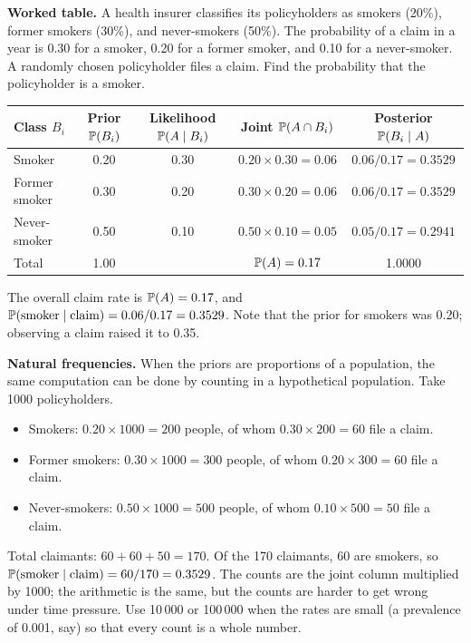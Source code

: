\textbf{Worked table.} A health insurer classifies its policyholders as smokers (20\%),
former smokers (30\%), and never-smokers (50\%). The probability of a claim in a year is 0.30
for a smoker, 0.20 for a former smoker, and 0.10 for a never-smoker. A randomly chosen
policyholder files a claim. Find the probability that the policyholder is a smoker.

\begin{center}
\begin{tabular}{@{}lcccc@{}}
\toprule
Class $B_i$ & Prior $\mathbb{P}(B_i)$ & Likelihood $\mathbb{P}(A \mid B_i)$ & Joint $\mathbb{P}(A \cap B_i)$ & Posterior $\mathbb{P}(B_i \mid A)$ \\
\midrule
Smoker        & 0.20 & 0.30 & $0.20 \times 0.30 = 0.06$ & $0.06/0.17 = 0.3529$ \\
Former smoker & 0.30 & 0.20 & $0.30 \times 0.20 = 0.06$ & $0.06/0.17 = 0.3529$ \\
Never-smoker  & 0.50 & 0.10 & $0.50 \times 0.10 = 0.05$ & $0.05/0.17 = 0.2941$ \\
\midrule
Total         & 1.00 &      & $\mathbb{P}(A) = 0.17$          & 1.0000 \\
\bottomrule
\end{tabular}
\end{center}

The overall claim rate is $\mathbb{P}(A) = 0.17$, and $\mathbb{P}(\text{smoker} \mid \text{claim}) = 0.06/0.17 = 0.3529$.
Note that the prior for smokers was 0.20; observing a claim raised it to 0.35.

\textbf{Natural frequencies.} When the priors are proportions of a population, the same
computation can be done by counting in a hypothetical population. Take 1000 policyholders.
\begin{itemize}[nosep,leftmargin=2em]
  \item Smokers: $0.20 \times 1000 = 200$ people, of whom $0.30 \times 200 = 60$ file a claim.
  \item Former smokers: $0.30 \times 1000 = 300$ people, of whom $0.20 \times 300 = 60$ file a claim.
  \item Never-smokers: $0.50 \times 1000 = 500$ people, of whom $0.10 \times 500 = 50$ file a claim.
\end{itemize}
Total claimants: $60 + 60 + 50 = 170$. Of the 170 claimants, 60 are smokers, so
$\mathbb{P}(\text{smoker} \mid \text{claim}) = 60/170 = 0.3529$. The counts are the joint column
multiplied by 1000; the arithmetic is the same, but the counts are harder to get wrong under
time pressure. Use 10\,000 or 100\,000 when the rates are small (a prevalence of 0.001, say)
so that every count is a whole number.

